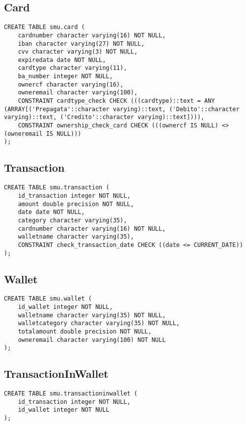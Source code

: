 \subsection{Card}

\begin{lstlisting}
CREATE TABLE smu.card (
    cardnumber character varying(16) NOT NULL,
    iban character varying(27) NOT NULL,
    cvv character varying(3) NOT NULL,
    expiredata date NOT NULL,
    cardtype character varying(11),
    ba_number integer NOT NULL,
    ownercf character varying(16),
    owneremail character varying(100),
    CONSTRAINT cardtype_check CHECK (((cardtype)::text = ANY (ARRAY[('Prepagata'::character varying)::text, ('Debito'::character varying)::text, ('Credito'::character varying)::text]))),
    CONSTRAINT ownership_check_card CHECK (((ownercf IS NULL) <> (owneremail IS NULL)))
);
\end{lstlisting}

\subsection{Transaction}

\begin{lstlisting}
CREATE TABLE smu.transaction (
    id_transaction integer NOT NULL,
    amount double precision NOT NULL,
    date date NOT NULL,
    category character varying(35),
    cardnumber character varying(16) NOT NULL,
    walletname character varying(35),
    CONSTRAINT check_transaction_date CHECK ((date <= CURRENT_DATE))
);
\end{lstlisting}

\subsection{Wallet}

\begin{lstlisting}
CREATE TABLE smu.wallet (
    id_wallet integer NOT NULL,
    walletname character varying(35) NOT NULL,
    walletcategory character varying(35) NOT NULL,
    totalamount double precision NOT NULL,
    owneremail character varying(100) NOT NULL
);
\end{lstlisting}

\subsection{TransactionInWallet}

\begin{lstlisting}
CREATE TABLE smu.transactioninwallet (
    id_transaction integer NOT NULL,
    id_wallet integer NOT NULL
);
\end{lstlisting}

